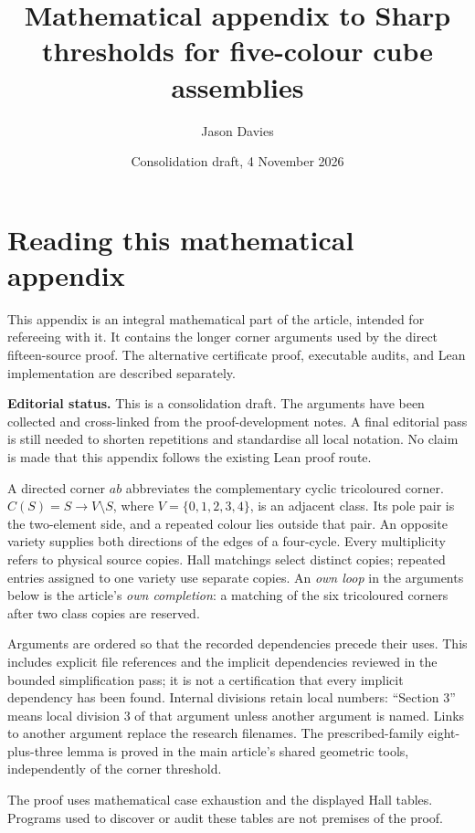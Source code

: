 \documentclass[
  10pt,
]{article}
\title{Mathematical appendix to Sharp thresholds for five-colour cube
assemblies}
\author{Jason Davies}
\date{Consolidation draft, 4 November 2026}
\begin{document}
\maketitle

{
\setcounter{tocdepth}{3}
\tableofcontents
}
\hypertarget{reading-this-mathematical-appendix}{%
\section{Reading this mathematical
appendix}\label{reading-this-mathematical-appendix}}

This appendix is an integral mathematical part of the article, intended
for refereeing with it. It contains the longer corner arguments used by
the direct fifteen-source proof. The alternative certificate proof,
executable audits, and Lean implementation are described separately.

\textbf{Editorial status.} This is a consolidation draft. The arguments
have been collected and cross-linked from the proof-development notes. A
final editorial pass is still needed to shorten repetitions and
standardise all local notation. No claim is made that this appendix
follows the existing Lean proof route.

A directed corner \(ab\) abbreviates the complementary cyclic
tricoloured corner. \(C(S)=S\to V\setminus S\), where
\(V=\{0,1,2,3,4\}\), is an adjacent class. Its pole pair is the
two-element side, and a repeated colour lies outside that pair. An
opposite variety supplies both directions of the edges of a four-cycle.
Every multiplicity refers to physical source copies. Hall matchings
select distinct copies; repeated entries assigned to one variety use
separate copies. An \emph{own loop} in the arguments below is the
article's \emph{own completion}: a matching of the six tricoloured
corners after two class copies are reserved.

Arguments are ordered so that the recorded dependencies precede their
uses. This includes explicit file references and the implicit
dependencies reviewed in the bounded simplification pass; it is not a
certification that every implicit dependency has been found. Internal
divisions retain local numbers: ``Section 3'' means local division 3 of
that argument unless another argument is named. Links to another
argument replace the research filenames. The prescribed-family
eight-plus-three lemma is proved in the main article's shared geometric
tools, independently of the corner threshold.

The proof uses mathematical case exhaustion and the displayed Hall
tables. Programs used to discover or audit these tables are not premises
of the proof.
\end{document}
